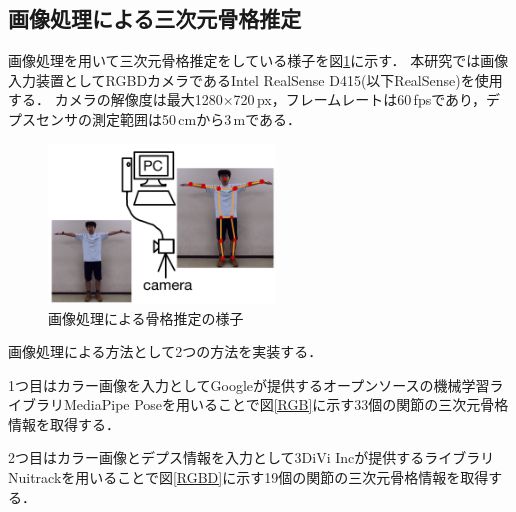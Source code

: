 \documentclass[titlepage]{jarticle}
\begin{document}
\subsection{画像処理による三次元骨格推定}\label{3Dskeleton}
画像処理を用いて三次元骨格推定をしている様子を図\ref{image_3D}に示す．
本研究では画像入力装置としてRGBDカメラであるIntel RealSense D415(以下RealSense)を使用する．
カメラの解像度は最大1280$\times$720\,px，フレームレートは60\,fpsであり，デプスセンサの測定範囲は50\,cmから3\,mである．
\begin{figure}[b]
  \centering
  \includegraphics[width=6cm]{img/image_3D.jpg}
  \caption{画像処理による骨格推定の様子}
  \label{image_3D}
\end{figure}

画像処理による方法として2つの方法を実装する．

1つ目はカラー画像を入力としてGoogleが提供するオープンソースの機械学習ライブラリMediaPipe Poseを用いることで図\ref{RGB}に示す33個の関節の三次元骨格情報を取得する．

2つ目はカラー画像とデプス情報を入力として3DiVi Incが提供するライブラリNuitrackを用いることで図\ref{RGBD}に示す19個の関節の三次元骨格情報を取得する．
\end{document}
